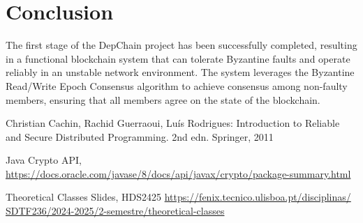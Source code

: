 \documentclass[runningheads]{llncs}
\begin{document}
\section{Conclusion}
The first stage of the DepChain project has been successfully completed,
resulting in a functional blockchain system that can tolerate Byzantine faults
and operate reliably in an unstable network environment. The system leverages
the Byzantine Read/Write Epoch Consensus algorithm to achieve consensus among
non-faulty members, ensuring that all members agree on the state of the
blockchain.

\begin{thebibliography}{8}

Christian Cachin, Rachid Guerraoui, Luís Rodrigues: Introduction to Reliable and
Secure Distributed Programming. 2nd edn. Springer, 2011

Java Crypto API,
\url{https://docs.oracle.com/javase/8/docs/api/javax/crypto/package-summary.html}

Theoretical Classes Slides, HDS2425
\url{https://fenix.tecnico.ulisboa.pt/disciplinas/ SDTF236/2024-2025/2-semestre/theoretical-classes}
\end{thebibliography}
\end{document}
